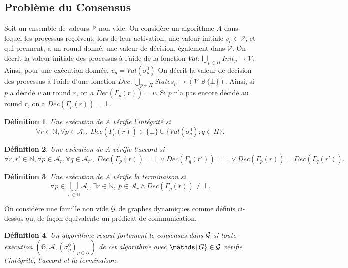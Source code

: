 \documentclass{article}
\newtheorem{definition}{Définition}
\begin{document}
\subsection{Probl\`eme du Consensus}

	Soit un ensemble de valeurs $\mathcal{V}$ non vide.
	On considère un algorithme $A$ dans lequel les processus reçoivent, lors de leur activation, une valeur initiale $v_p \in \mathcal{V}$,
	et qui prennent, à un round donné, une valeur de décision, également dans $\mathcal{V}$.
	On décrit la valeur initiale des processus à l'aide de la fonction $Val : \bigcup\limits_{p \in \Pi} Init_p  \rightarrow \mathcal{V}$.
	Ainsi, pour une exécution donnée, $v_p = Val(\sigma_p^0)$
	On décrit la valeur de décision des processus à l'aide d'une fonction
	$Dec : \bigcup\limits_{p \in \Pi} States_p  \rightarrow (\mathcal{V} \uplus \{\bot\})$.
	Ainsi, si $p$ a décidé $v$ au round $r$, on a $Dec(\Gamma_p(r)) = v$. Si $p$ n'a pas encore décidé au round $r$, on a $Dec(\Gamma_p(r)) = \bot$.

\begin{definition}
	Une exécution de A \emph{vérifie  l'intégrité} si 
	$$ \forall r \in \mathds{N},\forall p \in \mathcal{A}_{r}, \ Dec(\Gamma_p(r)) \in \{ \bot \} \cup  \{ Val(\sigma^0_q) :  q \in \Pi \}  .$$
\end{definition}

\begin{definition}
	Une exécution de A  \emph{vérifie l'accord} si
	$$\forall r, r'  \in \mathds{N}, \forall p \in \mathcal{A}_{r}, \forall q \in \mathcal{A}_{r'}, 
		\ Dec(\Gamma_p(r)) = \bot \vee Dec(\Gamma_q(r')) = \bot \vee Dec(\Gamma_p(r)) = Dec(\Gamma_q(r')) .$$
\end{definition}

\begin{definition}
	Une exécution de A \emph{vérifie la terminaison} si
	$$ \forall p \in \bigcup\limits_{s \in \mathds{N}} \mathcal{A}_s, \exists r \in \mathds{N}, \ 
		p \in \mathcal{A}_r \wedge Dec(\Gamma_p(r)) \neq \bot .  $$
\end{definition}

On consid\`ere une famille non vide ${\cal G}$ de graphes dynamiques comme d\'efinis ci-dessus
	ou, de fa\c{c}on \'equivalente un pr\'edicat de communication. %
	
\begin{definition}\label{def:resforte}
	Un algorithme \emph{résout fortement le consensus dans ${\cal G}$} si toute exécution 
	$( \mathds{G} ,  \mathcal{A} , (\sigma^0_p)_{p \in \Pi})$    de cet algorithme
	avec $ \mathds{G} \in {\cal G}$  vérifie l'intégrité, l'accord et la terminaison.
\end{definition}
\end{document}

